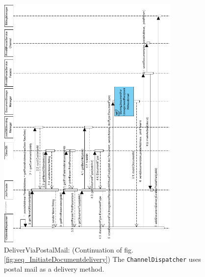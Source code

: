 \documentclass[a4paper,10pt]{article}
\begin{document}
\begin{figure}[!htp]
    \centering
    \includegraphics[width=0.8\textwidth]{DeliverViaPostalMail.png}
    \caption{DeliverViaPostalMail: (Continuation of  fig. \ref{fig:seq_InitiateDocumentdelivery}) The  \texttt{ChannelDispatcher} uses postal mail as a delivery method.
        }\label{fig:seq_DeliverViaPostalMail}
\end{figure}
\end{document}
